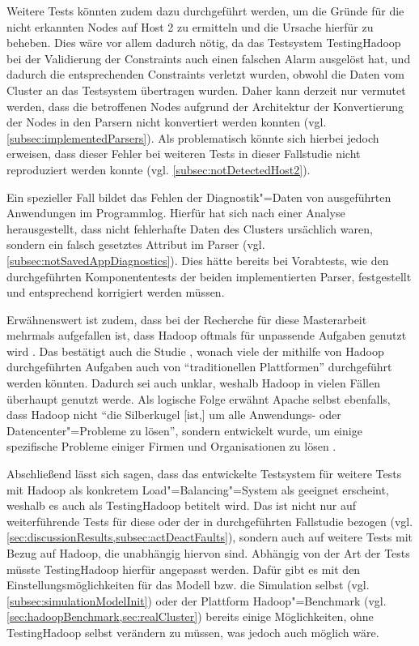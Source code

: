 Weitere Tests könnten zudem dazu durchgeführt werden, um die Gründe für die nicht erkannten Nodes auf Host 2 zu ermitteln und die Ursache hierfür zu beheben.
Dies wäre vor allem dadurch nötig, da das Testsystem TestingHadoop bei der Validierung der Constraints auch einen falschen Alarm ausgelöst hat, und dadurch die entsprechenden Constraints verletzt wurden, obwohl die Daten vom Cluster an das Testsystem übertragen wurden.
Daher kann derzeit nur vermutet werden, dass die betroffenen Nodes aufgrund der Architektur der Konvertierung der Nodes in den Parsern nicht konvertiert werden konnten (vgl. \cref{subsec:implementedParsers}).
Als problematisch könnte sich hierbei jedoch erweisen, dass dieser Fehler bei weiteren Tests in dieser Fallstudie nicht reproduziert werden konnte (vgl. \cref{subsec:notDetectedHost2}).

Ein spezieller Fall bildet das Fehlen der Diagnostik"=Daten von ausgeführten Anwendungen im Programmlog.
Hierfür hat sich nach einer Analyse herausgestellt, dass nicht fehlerhafte Daten des Clusters ursächlich waren, sondern ein falsch gesetztes Attribut im Parser (vgl. \cref{subsec:notSavedAppDiagnostics}).
Dies hätte bereits bei Vorabtests, wie den durchgeführten Komponententests der beiden implementierten Parser, festgestellt und entsprechend korrigiert werden müssen.

Erwähnenswert ist zudem, dass bei der Recherche für diese Masterarbeit mehrmals aufgefallen ist, dass Hadoop oftmals für unpassende Aufgaben genutzt wird \cite{Ren2013,Vavilapalli2013}.
Das bestätigt auch die Studie \cite{HadoopDataTypes}, wonach viele der mithilfe von Hadoop durchgeführten Aufgaben auch von \enquote{traditionellen Plattformen} durchgeführt werden könnten.
Dadurch sei auch unklar, weshalb Hadoop in vielen Fällen überhaupt genutzt werde.
Als logische Folge erwähnt Apache selbst ebenfalls, dass Hadoop nicht \enquote{die Silberkugel [ist,] um alle Anwendungs- oder Datencenter"=Probleme zu lösen}, sondern entwickelt wurde, um einige spezifische Probleme einiger Firmen und Organisationen zu lösen \cite{HadoopIsNot}.

Abschließend lässt sich sagen, dass das entwickelte Testsystem für weitere Tests mit Hadoop als konkretem Load"=Balancing"=System als geeignet erscheint, weshalb es auch als TestingHadoop betitelt wird.
Das ist nicht nur auf weiterführende Tests für diese oder der in \cite{Eberhardinger2018} durchgeführten Fallstudie bezogen (vgl. \cref{sec:discussionResults,subsec:actDeactFaults}), sondern auch auf weitere Tests mit Bezug auf Hadoop, die unabhängig hiervon sind.
Abhängig von der Art der Tests müsste TestingHadoop  hierfür angepasst werden.
Dafür gibt es mit den Einstellungsmöglichkeiten für das Modell bzw. die Simulation selbst (vgl. \cref{subsec:simulationModelInit}) oder der Plattform Hadoop"=Benchmark (vgl. \cref{sec:hadoopBenchmark,sec:realCluster}) bereits einige Möglichkeiten, ohne TestingHadoop selbst verändern zu müssen, was jedoch auch möglich wäre.
